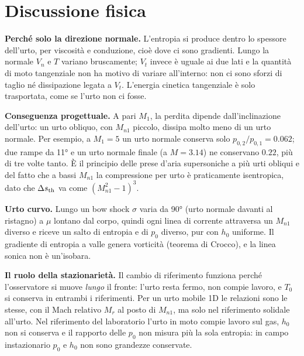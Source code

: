 \documentclass[11pt,a4paper]{article}
\newcommand{\sth}{s_{\rm th}}
\newcommand{\Mn}{M_{n1}}
\newcommand{\Mr}{M_{r}}
\begin{document}
\section{Discussione fisica}
\textbf{Perché solo la direzione normale.} L'entropia si produce dentro lo spessore dell'urto, per viscosità e
conduzione, cioè dove ci sono gradienti. Lungo la normale $V_n$ e $T$ variano bruscamente; $V_t$ invece è uguale ai
due lati e la quantità di moto tangenziale non ha motivo di variare all'interno: non ci sono sforzi di taglio né
dissipazione legata a $V_t$. L'energia cinetica tangenziale è solo trasportata, come se l'urto non ci fosse.

\textbf{Conseguenza progettuale.} A pari $M_1$, la perdita dipende dall'inclinazione dell'urto: un urto obliquo,
con $\Mn$ piccolo, dissipa molto meno di un urto normale. Per esempio, a $M_1=5$ un urto normale conserva solo
$p_{0,2}/p_{0,1}=\num{0.062}$; due rampe da \ang{11} e un urto normale finale (a $M=\num{3.14}$) ne conservano
$\num{0.22}$, più di tre volte tanto. È il principio delle prese d'aria supersoniche a più urti obliqui e del
fatto che a bassi $\Mn$ la compressione per urto è praticamente isentropica, dato che $\Delta\sth$ va come
$(\Mn^2-1)^3$.

\textbf{Urto curvo.} Lungo un bow shock $\sigma$ varia da \ang{90} (urto normale davanti al ristagno) a $\mu$
lontano dal corpo, quindi ogni linea di corrente attraversa un $\Mn$ diverso e riceve un salto di entropia e di
$p_0$ diverso, pur con $h_0$ uniforme. Il gradiente di entropia a valle genera vorticità (teorema di Crocco), e la
linea sonica non è un'isobara.

\textbf{Il ruolo della stazionarietà.} Il cambio di riferimento funziona perché l'osservatore si muove
\emph{lungo} il fronte: l'urto resta fermo, non compie lavoro, e $T_0$ si conserva in entrambi i riferimenti. Per un
urto mobile 1D le relazioni sono le stesse, con il Mach relativo $\Mr$ al posto di $\Mn$, ma solo nel riferimento
solidale all'urto. Nel riferimento del laboratorio l'urto in moto compie lavoro sul gas, $h_0$ non si conserva e il
rapporto delle $p_0$ non misura più la sola entropia: in campo instazionario $p_0$ e $h_0$ non sono grandezze
conservate.
\end{document}
